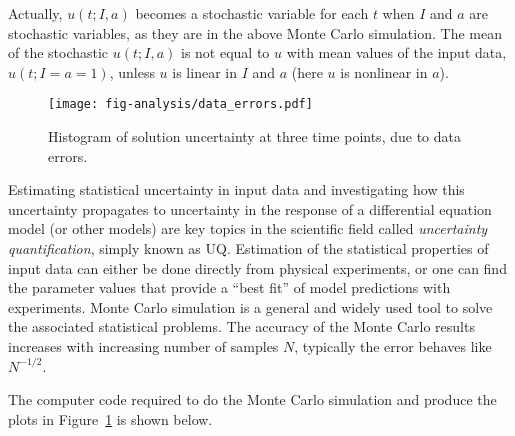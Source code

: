 \documentclass[graybox,sectrefs,envcountresetchap,open=right,final]{svmonodo}
\begin{document}
\noindent
Actually, $u(t;I,a)$ becomes a stochastic variable for each $t$ when
$I$ and $a$ are stochastic variables, as they are in the above
Monte Carlo simulation. The mean of the stochastic $u(t;I,a)$ is
not equal to $u$ with mean values of the input data, $u(t;I=a=1)$,
unless $u$ is linear in $I$ and $a$ (here $u$ is nonlinear in $a$).

\begin{figure}[!ht]  %
  \centerline{\texttt{[image: fig-analysis/data\_errors.pdf]}}
  \caption{
  Histogram of solution uncertainty at three time points, due to data errors. \label{decay:analysis:data_errors:fig}
  }
\end{figure}


Estimating statistical uncertainty in input data and investigating how
this uncertainty propagates to uncertainty in the response of a
differential equation model (or other models) are key topics in the
scientific field called \emph{uncertainty quantification}, simply known as
UQ.  Estimation of the statistical properties of input data can either
be done directly from physical experiments, or one can find the
parameter values that provide a ``best fit'' of model predictions with
experiments. Monte Carlo simulation is a general and widely used tool
to solve the associated statistical problems.  The accuracy of the
Monte Carlo results increases with increasing number of samples $N$,
typically the error behaves like $N^{-1/2}$.

The computer code required to do the Monte Carlo simulation and
produce the plots in Figure~\ref{decay:analysis:data_errors:fig}
is shown below.
\end{document}
